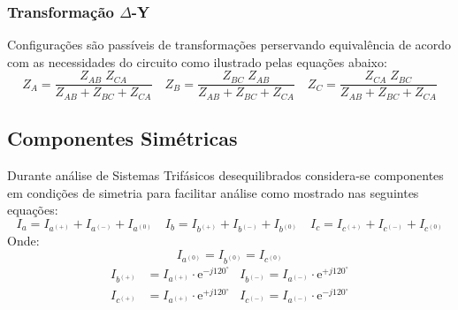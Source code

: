 \documentclass{article}
\begin{document}
        \subsubsection{Transformação $\Delta$-Y}
            \begin{definition}
                Configurações são passíveis de transformações perservando equivalência de acordo com as necessidades do circuito como ilustrado pelas equações abaixo:
                    \begin{equation}
                        \boxed{Z_{A} = \frac{Z_{AB}\;Z_{CA}}{Z_{AB} + Z_{BC} + Z_{CA}}}
                        \quad
                        \boxed{Z_{B} = \frac{Z_{BC}\;Z_{AB}}{Z_{AB} + Z_{BC} + Z_{CA}}}
                        \quad
                        \boxed{Z_{C} = \frac{Z_{CA}\;Z_{BC}}{Z_{AB} + Z_{BC} + Z_{CA}}}
                    \end{equation}
            \end{definition}

    \subsection{Componentes Simétricas}
        \begin{definition}
            Durante análise de Sistemas Trifásicos desequilibrados considera-se componentes em condições de simetria para facilitar análise como mostrado nas seguintes equações:
                \begin{equation}
                    \boxed{I_{a} = I_{a^{(+)}} + I_{a^{(-)}} + I_{a^{(0)}}}
                    \quad
                    \boxed{I_{b} = I_{b^{(+)}} + I_{b^{(-)}} + I_{b^{(0)}}}
                    \quad
                    \boxed{I_{c} = I_{c^{(+)}} + I_{c^{(-)}} + I_{c^{(0)}}}
                \end{equation}
            Onde:
                \begin{equation*}
                    I_{a^{(0)}} = I_{b^{(0)}} = I_{c^{(0)}}
                \end{equation*}
                \begin{align}
                    I_{b^{(+)}} &= I_{a^{(+)}}\cdot\text{e}^{-j120^{\circ}} & I_{b^{(-)}} = I_{a^{(-)}}\cdot\text{e}^{+j120^{\circ}}\nonumber\\
                    I_{c^{(+)}} &= I_{a^{(+)}}\cdot\text{e}^{+j120^{\circ}} & I_{c^{(-)}} = I_{a^{(-)}}\cdot\text{e}^{-j120^{\circ}}\nonumber
                \end{align}
        \end{definition}
\end{document}
